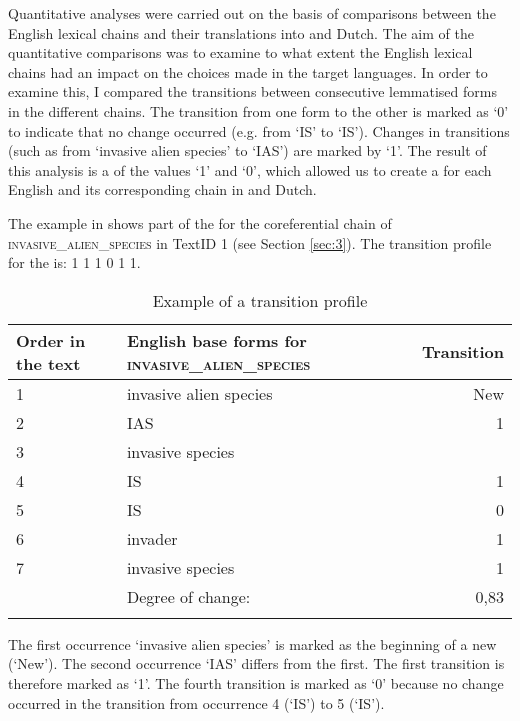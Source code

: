 \documentclass[output=paper]{langsci/langscibook.cls}
\begin{document}
Quantitative analyses were carried out on the basis of comparisons between the 
English lexical chains and their translations into  and Dutch. The aim of 
the quantitative comparisons was to examine to what extent the English lexical 
chains had an impact on the choices made in the target languages. In order to examine 
this, I compared the transitions between consecutive lemmatised forms in the different 
chains. The transition from one form to the other is marked as `0' to indicate 
that no change occurred (e.g. from `IS' to `IS'). Changes in transitions (such as 
from `invasive alien species' to `IAS') are marked by `1'. The result of this 
analysis is a  of the values `1' and `0', which allowed us to create a 
 for each English  and its corresponding 
chain in  and Dutch. 

The example in  shows part of the  for the coreferential 
chain of \textsc{invasive\_alien\_species} in TextID 1 (see Section \ref{sec:3}). The transition 
profile for the  is: 1 1 1 0 1 1.

\begin{table} 
		\begin{tabular}{p{1.5cm}lr}
\lsptoprule
\textbf{Order in the text} & \textbf{English base forms for} \textsc{invasive\_alien\_species} & \textbf{Transition}\\
\midrule
1 & invasive alien species & New\\
2 & IAS & 1 \\
3 & invasive species & \\
4 & IS & 1 \\
5 & IS & 0 \\
6 & invader & 1 \\
7 & invasive species & 1 \\
\midrule
 & Degree of change: & 0,83\\
\lspbottomrule
\end{tabular}
\caption{Example of a transition profile}
\label{tab:5}
\end{table}

The first occurrence `invasive alien species' is  marked as the beginning of a new  (`New'). The 
second occurrence `IAS' differs from the first. The first transition is therefore 
marked as `1'. The fourth transition is marked as `0' because no change occurred 
in the transition from occurrence 4 (`IS') to 5 (`IS').
\end{document}

